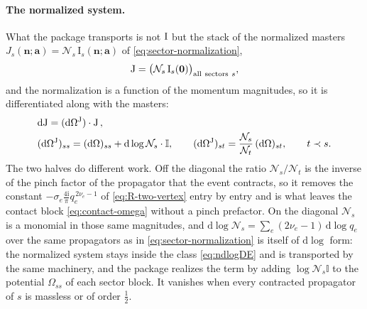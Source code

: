 \documentclass[11pt,a4paper]{article}
\newcommand{\nn}{\nonumber}
\newcommand{\nd}{\mathrm{d}}
\newcommand{\ii}{\mathrm i}
\newcommand{\Id}{\mathbb I}
\newcommand{\cN}{\mathcal N}
\begin{document}
\paragraph{The normalized system.}
What the package transports is not $\bm{\text I}$ but the stack of the normalized masters
$J_s(\bm n;\bm a)=\cN_s\,\text{I}_s(\bm n;\bm a)$ of \eqref{eq:sector-normalization},
\begin{equation}
  \bm{\text J}=\big(\cN_s\,\bm{\text I}_s(\bm 0)\big)_{{\rm all\ sectors}\ s},
  \label{eq:normalized-vector}
\end{equation}
and the normalization is a function of the momentum magnitudes, so it is differentiated along with the
masters:
\begin{align}
&\nd \bm{\text J} = (\nd \Omega^{\rm J}) \cdot \bm{\text J} \, ,\nn\\
&(\nd\Omega^{\rm J})_{ss}=(\nd\Omega)_{ss}+\nd\log\cN_s\cdot\Id,
\qquad
(\nd\Omega^{\rm J})_{st}=\frac{\cN_s}{\cN_t}\,(\nd\Omega)_{st},
\qquad t\prec s.
\label{eq:normalized-de}
\end{align}
The two halves do different work. Off the diagonal the ratio $\cN_s/\cN_t$ is the inverse of the
pinch factor of the propagator that the event contracts, so it removes the constant
$-\sigma_e\frac{4\ii}{\pi}q_e^{\,2\nu_e-1}$ of \eqref{eq:R-two-vertex} entry by entry and is what
leaves the contact block \eqref{eq:contact-omega} without a pinch prefactor. On the diagonal
$\cN_s$ is a monomial in those same magnitudes, and
$\nd\log\cN_s=\sum_e(2\nu_e-1)\,\nd\log q_e$ over the same propagators as in
\eqref{eq:sector-normalization} is itself of $\nd\log$ form: the normalized system stays inside the
class \eqref{eq:ndlogDE} and is transported by the same machinery, and the package realizes the term
by adding $\log\cN_s\Id$ to the potential $\Omega_{ss}$ of each sector block. It vanishes when every
contracted propagator of $s$ is massless or of order $\tfrac12$.
\end{document}
